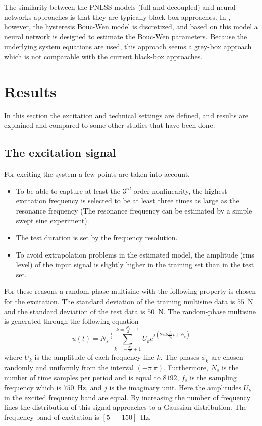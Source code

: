 \documentclass[review]{elsarticle}
\begin{document}
The similarity between the PNLSS models (full and decoupled) and neural networks approaches is that they are typically black-box approaches. In \citep{xie2013identification}, however, the hysteresis Bouc-Wen model is discretized, and based on this model a neural network is designed to estimate the Bouc-Wen parameters. Because the underlying system equations are used, this approach seems a grey-box approach which is not comparable with the current black-box approaches.
\section{Results}\label{Sec:Res}
In this section the excitation and technical settings are defined, and results are explained and compared to some other studies that have been done.
\subsection{The excitation signal\label{Sec:Exc}}
For exciting the system a few points are taken into account.
\begin{itemize}
\item To be able to capture at least the $3^{rd}$ order nonlinearity, the highest excitation frequency  is selected to be at least three times as large as the resonance frequency (The resonance frequency can be estimated by a simple swept sine experiment).
\item The test duration is set by the frequency resolution.
\item To avoid extrapolation problems in the estimated model, the amplitude (rms level) of the input signal is slightly higher in the training set than in the test set.
\end{itemize}
For these reasons a random phase multisine \citep{Johan1} with the following property is chosen for the excitation. The standard deviation of the training multisine data is $55$~N and the standard deviation of the test data is $50$~N.
The random-phase multisine is generated through the following equation
\begin{equation}
u(t)=N_s^{-\frac{1}{2}}\sum_{k=-\frac{N_s}{2}+1}^{k=\frac{N_s}{2}-1}U_ke^{j(2\pi k \frac{f_s}{N_s}t+\phi_k)}
\end{equation}
where $U_k$ is the amplitude of each frequency line $k$. The phases $\phi_k$ are chosen randomly and uniformly from the interval $(-\pi \ \pi)$. Furthermore, $N_s$  is the number of time samples per period and is equal to $8192$, $f_s$ is the sampling frequency which is $750$~Hz, and $j$ is the imaginary unit.  Here the amplitudes $U_k$ in the excited frequency band are equal. By increasing the number of frequency lines the distribution of this signal approaches to a Gaussian distribution. The frequency band of excitation is $[5 \ - \ 150]$~Hz.
\end{document}
